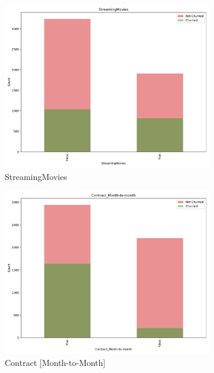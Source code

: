 \documentclass[a4paper,11pt]{article}
\begin{document}
\begin{landscape}
\begin{figure}
\begin{subfigure}{0.14\linewidth}
    \includegraphics[width=\linewidth]{figures/understanding/StreamingMovies.pdf}
    \caption{StreamingMovies}
\end{subfigure}
\begin{subfigure}{0.14\linewidth}
    \includegraphics[width=\linewidth]{figures/understanding/Contract_Month-to-month.pdf}
    \caption{Contract [Month-to-Month]}
\end{subfigure}
\begin{subfigure}{0.14\linewidth}

\end{subfigure}
\end{figure}
\end{landscape}
\end{document}
